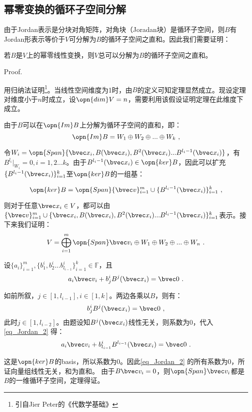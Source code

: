 \subsection{幂零变换的循环子空间分解}

由于Jordan表示是分块对角矩阵，对角块（Joradan块）是循环子空间，则$B$有Jordan形表示等价于$V$可分解为$B$的循环子空间之直和。因此我们需要证明：

\begin{theorem}{}\label{the_Jordan_1}
若$B$是$V$上的幂零线性变换，则$V$总可以分解为$B$的循环子空间之直和。
\end{theorem}
Proof.

用归纳法证明\footnote{引自Jier Peter的《代数学基础》}。当线性空间维度为1时，由$B$的定义可知定理显然成立。现设定理对维度小于$n$时成立，设$\opn{dim}V=n$，需要利用该假设证明定理在此维度下成立。

由于$B$可以在$\opn{Im}B$上分解为循环子空间的直和，即：
\begin{equation}
\opn{Im}B=W_1\oplus W_2\oplus...\oplus W_k~,
\end{equation}

令$W_i=\opn{Span}\{\bvec x_i,B(\bvec x_i),B^2(\bvec x_i)...B^{l_i-1}(\bvec x_i)\}$，有$B^{l_i}|_{W_i}=0,i=1,2...k$。由于$B^{l_i-1}(\bvec x_i)\in \opn{ker}B$，因此可以扩充$\{B^{l_i-1}(\bvec x_i)\}^k_{i=1}$至$\opn{ker}B$的一组基：

\begin{equation}
\opn{ker}B=\opn{Span}\{\bvec v\}^m_{i=1}\cup \{B^{l_i-1}(\bvec x_i)\}^k_{i=1}~,
\end{equation}

则对于任意$\bvec x_i\in V$，都可以由$\{\bvec v\}^m_{i=1}\cup \{\bvec x_i,B(\bvec x_i),B^2(\bvec x_i)...B^{l_i-1}(\bvec x_i)\}^{k}_{i=1}$表示。接下来我们证明：
\begin{equation}
V=\bigoplus ^m_{i=1}\opn{Span}\bvec v_i\oplus W_1\oplus W_2\oplus...\oplus W_n~.
\end{equation}


设$\{a_i\}^m_{i=1},\{b^i_1,b^i_2...b^i_{l_{i-1}}\}^{k}_{i=1}\in\mathbb F$，且
\begin{equation}\label{eq_Jordan_2}
a_i\bvec v_i+b^i_jB^{j}(\bvec x_i)=\bvec 0~.
\end{equation}

如前所叙，$j\in[1,l_{i-1}],i\in[1,k]$。两边各乘以$B$，则有：
\begin{equation}
b^i_jB^{j}(\bvec x_i)=\bvec 0~,
\end{equation}
此时$j\in[1,l_{i-2}]$。由题设知$B^j(\bvec x_i)$线性无关，则系数为$0$，代入\autoref{eq_Jordan_2} 得：
\begin{equation}
a_i\bvec v_i+b^i_{l_{i-1}}B^{l_{i-1}}(\bvec x_i)=\bvec 0~.
\end{equation}

这是$\opn{ker}B$的basis，所以系数为$0$。因此\autoref{eq_Jordan_2} 的所有系数为0，所证向量组线性无关，和为直和。
由于$B\bvec v_i=0$，则$\opn{Span}\bvec v_i$都是$B$的一维循环子空间，定理得证。


